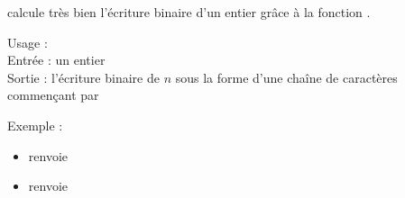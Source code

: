 \documentclass[11pt,class=report,crop=false]{standalone}
\begin{document}
\begin{cours}

\Python{} calcule très bien l'écriture binaire d'un entier grâce à la fonction .
  
   \begin{fonctionpython}
    Usage : \\
    Entrée : un entier  \\
    Sortie : l'écriture binaire de $n$ sous la forme d'une chaîne de caractères commençant par 
  
  \medskip
     
   Exemple :
  \begin{itemize}  
    \item {} renvoie 
    \item {} renvoie 
  \end{itemize} 
  \end{fonctionpython}  
   
\end{cours}
\end{document}
